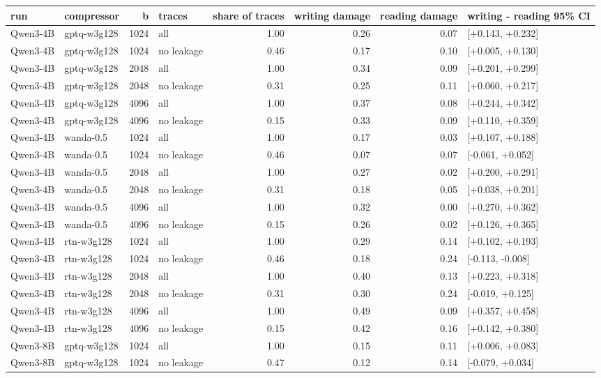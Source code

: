 \begin{tabular}{llrlrrrl}
\toprule
run & compressor & b & traces & share of traces & writing damage & reading damage & writing - reading 95\% CI \\
\midrule
Qwen3-4B & gptq-w3g128 & 1024 & all & 1.00 & 0.26 & 0.07 & [+0.143, +0.232] \\
Qwen3-4B & gptq-w3g128 & 1024 & no leakage & 0.46 & 0.17 & 0.10 & [+0.005, +0.130] \\
Qwen3-4B & gptq-w3g128 & 2048 & all & 1.00 & 0.34 & 0.09 & [+0.201, +0.299] \\
Qwen3-4B & gptq-w3g128 & 2048 & no leakage & 0.31 & 0.25 & 0.11 & [+0.060, +0.217] \\
Qwen3-4B & gptq-w3g128 & 4096 & all & 1.00 & 0.37 & 0.08 & [+0.244, +0.342] \\
Qwen3-4B & gptq-w3g128 & 4096 & no leakage & 0.15 & 0.33 & 0.09 & [+0.110, +0.359] \\
Qwen3-4B & wanda-0.5 & 1024 & all & 1.00 & 0.17 & 0.03 & [+0.107, +0.188] \\
Qwen3-4B & wanda-0.5 & 1024 & no leakage & 0.46 & 0.07 & 0.07 & [-0.061, +0.052] \\
Qwen3-4B & wanda-0.5 & 2048 & all & 1.00 & 0.27 & 0.02 & [+0.200, +0.291] \\
Qwen3-4B & wanda-0.5 & 2048 & no leakage & 0.31 & 0.18 & 0.05 & [+0.038, +0.201] \\
Qwen3-4B & wanda-0.5 & 4096 & all & 1.00 & 0.32 & 0.00 & [+0.270, +0.362] \\
Qwen3-4B & wanda-0.5 & 4096 & no leakage & 0.15 & 0.26 & 0.02 & [+0.126, +0.365] \\
Qwen3-4B & rtn-w3g128 & 1024 & all & 1.00 & 0.29 & 0.14 & [+0.102, +0.193] \\
Qwen3-4B & rtn-w3g128 & 1024 & no leakage & 0.46 & 0.18 & 0.24 & [-0.113, -0.008] \\
Qwen3-4B & rtn-w3g128 & 2048 & all & 1.00 & 0.40 & 0.13 & [+0.223, +0.318] \\
Qwen3-4B & rtn-w3g128 & 2048 & no leakage & 0.31 & 0.30 & 0.24 & [-0.019, +0.125] \\
Qwen3-4B & rtn-w3g128 & 4096 & all & 1.00 & 0.49 & 0.09 & [+0.357, +0.458] \\
Qwen3-4B & rtn-w3g128 & 4096 & no leakage & 0.15 & 0.42 & 0.16 & [+0.142, +0.380] \\
Qwen3-8B & gptq-w3g128 & 1024 & all & 1.00 & 0.15 & 0.11 & [+0.006, +0.083] \\
Qwen3-8B & gptq-w3g128 & 1024 & no leakage & 0.47 & 0.12 & 0.14 & [-0.079, +0.034] \\

\end{tabular}
